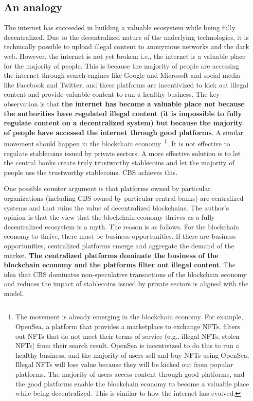\documentclass[dvipdfmx,a4paper]{article}
\begin{document}
\subsection{An analogy}

The internet has succeeded in building a valuable ecosystem while being fully decentralized. Due to the decentralized nature of the underlying technologies, it is technically possible to upload illegal content to anonymous networks and the dark web. However, the internet is not yet broken; i.e., the internet is a valuable place for the majority of people. This is because the majority of people are accessing the internet through search engines like Google and Microsoft and social media like Facebook and Twitter, and these platforms are incentivized to kick out illegal content and provide valuable content to run a healthy business. The key observation is that \textbf{the internet has become a valuable place not because the authorities have regulated illegal content (it is impossible to fully regulate content on a decentralized system) but because the majority of people have accessed the internet through good platforms}. A similar movement should happen in the blockchain economy~\footnote{The movement is already emerging in the blockchain economy. For example, OpenSea, a platform that provides a marketplace to exchange NFTs, filters out NFTs that do not meet their terms of service (e.g., illegal NFTs, stolen NFTs) from their search result. OpenSea is incentivized to do this to run a healthy business, and the majority of users sell and buy NFTs using OpenSea. Illegal NFTs will lose value because they will be kicked out from popular platforms. The majority of users access content through good platforms, and the good platforms enable the blockchain economy to become a valuable place while being decentralized. This is similar to how the internet has evolved.}. It is not effective to regulate stablecoins issued by private sectors. A more effective solution is to let the central banks create truly trustworthy stablecoins and let the majority of people use the trustworthy stablecoins. CBS achieves this.

One possible counter argument is that platforms owned by particular organizations (including CBS owned by particular central banks) are centralized systems and that ruins the value of decentralized blockchains. The author's opinion is that the view that the blockchain economy thrives as a fully decentralized ecosystem is a myth. The reason is as follows. For the blockchain economy to thrive, there must be business opportunities. If there are business opportunities, centralized platforms emerge and aggregate the demand of the market. \textbf{The centralized platforms dominate the business of the blockchain economy and the platforms filter out illegal content}. The idea that CBS dominates non-speculative transactions of the blockchain economy and reduces the impact of stablecoins issued by private sectors is aligned with the model.
\end{document}
